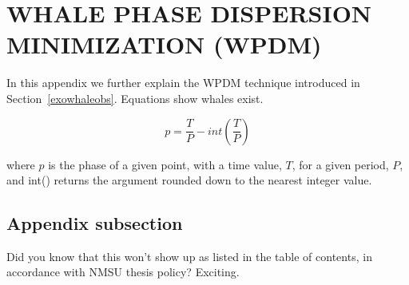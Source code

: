 \label{whaleappenda}
\section{\MakeUppercase{Whale Phase Dispersion Minimization (WPDM)}}

In this appendix we further explain the WPDM technique introduced in Section~\ref{exowhaleobs}. Equations show whales exist. 

\begin{equation}
p = \frac{T}{P} - int(\frac{T}{P})
\end{equation}

where $p$ is the phase of a given point, with a time value, $T$, for a given period, $P$, and int() returns the argument rounded down to the nearest integer value. 

\subsection{Appendix subsection}

Did you know that this won't show up as listed in the table of contents, in accordance with NMSU thesis policy? Exciting.